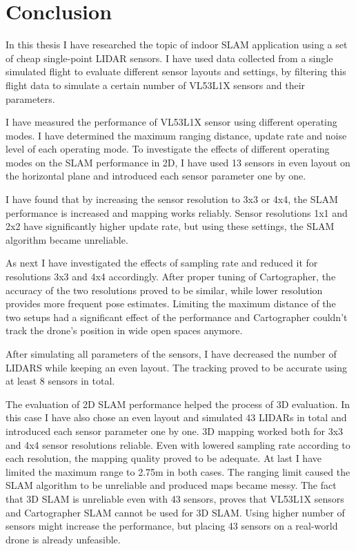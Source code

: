 \chapter{Conclusion}\label{chap:conclusion}
In this thesis I have researched the topic of indoor SLAM application using a set of cheap single-point 
LIDAR sensors. I have used data collected from a single simulated flight to evaluate different sensor 
layouts and settings, by filtering this flight data to simulate a certain number of VL53L1X sensors and 
their parameters.

I have measured the performance of VL53L1X sensor using different operating modes. I have determined 
the maximum ranging distance, update rate and noise level of each operating mode. To investigate the 
effects of different operating modes on the SLAM performance in 2D, I have used 13 sensors in even 
layout on the horizontal plane and introduced each sensor parameter one by one.

I have found that by increasing the sensor resolution to 3x3 or 4x4, the SLAM performance is increased
and mapping works reliably. Sensor resolutions 1x1 and 2x2 have significantly higher update rate, but 
using these settings, the SLAM algorithm became unreliable.

As next I have investigated the effects of sampling rate and reduced it for resolutions 3x3 and 4x4 
accordingly. After proper tuning of Cartographer, the accuracy of the two resolutions proved to be similar,
while lower resolution provides more frequent pose estimates. Limiting the maximum distance of the two
setups had a significant effect of the performance and Cartographer couldn't track the drone's position
in wide open spaces anymore.

After simulating all parameters of the sensors, I have decreased the number of LIDARS while keeping an
even layout. The tracking proved to be accurate using at least 8 sensors in total.

The evaluation of 2D SLAM performance helped the process of 3D evaluation. In this case I have also 
chose an even layout and simulated 43 LIDARs in total and introduced each sensor parameter one by one.
3D mapping worked both for 3x3 and 4x4 sensor resolutions reliable. Even with lowered sampling rate
according to each resolution, the mapping quality proved to be adequate.
At last I have limited the maximum range to 2.75m in both cases. The ranging limit caused the SLAM 
algorithm to be unreliable and produced maps became messy.
The fact that 3D SLAM is unreliable even with 43 sensors, proves that VL53L1X sensors and Cartographer
SLAM cannot be used for 3D SLAM. Using higher number of sensors might increase the performance,
but placing 43 sensors on a real-world drone is already unfeasible.

